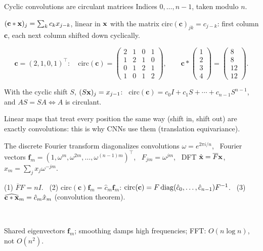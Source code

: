 \documentclass[aspectratio=1610,11pt]{beamer}
\begin{document}
\begin{frame}{Cyclic convolutions are circulant matrices}
    \small
    Indices $0, \ldots, n - 1$, taken modulo $n$.
    \begin{definition}
        \small $(\mathbf{c} \ast \mathbf{x})_j = \sum_kc_kx_{j-k}$, linear in $\mathbf{x}$ with the matrix $\mathrm{circ}(\mathbf{c})_{jk} = c_{j-k}$: first column $\mathbf{c}$, each next column shifted down cyclically.
    \end{definition}
    \[\mathbf{c} = (2, 1, 0, 1)^\top: \quad \mathrm{circ}(\mathbf{c}) = \begin{pmatrix} 2 & 1 & 0 & 1 \\ 1 & 2 & 1 & 0 \\ 0 & 1 & 2 & 1 \\ 1 & 0 & 1 & 2 \end{pmatrix}, \qquad \mathbf{c} \ast \begin{pmatrix} 1 \\ 2 \\ 3 \\ 4 \end{pmatrix} = \begin{pmatrix} 8 \\ 8 \\ 12 \\ 12 \end{pmatrix}.\]
    \begin{proposition}
        \small With the cyclic shift $S$, $(S\mathbf{x})_j = x_{j-1}$: \ $\mathrm{circ}(\mathbf{c}) = c_0I + c_1S + \cdots + c_{n-1}S^{n-1}$, and $AS = SA \iff A$ is circulant.
    \end{proposition}
    \textcolor{mlcolor}{Linear maps that treat every position the same way (shift in, shift out) are exactly convolutions: this is why CNNs use them (translation equivariance).}
\end{frame}

\begin{frame}{The discrete Fourier transform diagonalizes convolutions}
    \small
    $\omega = e^{2\pi i/n}$, \ Fourier vectors $\mathbf{f}_m = (1, \omega^m, \omega^{2m}, \ldots, \omega^{(n-1)m})^\top$, \ $F_{jm} = \omega^{jm}$, \ DFT $\hat{\mathbf{x}} = \overline{F}\mathbf{x}$, $\hat x_m = \sum_jx_j\omega^{-jm}$.
    \begin{theorem}
        \small (1) $\overline{F}F = nI$. \ (2) $\mathrm{circ}(\mathbf{c})\mathbf{f}_m = \hat c_m\mathbf{f}_m$: $\mathrm{circ}(\mathbf{c}) = F\operatorname{diag}(\hat c_0, \ldots, \hat c_{n-1})F^{-1}$. \ (3) $\widehat{\mathbf{c} \ast \mathbf{x}}_m = \hat c_m\hat x_m$ (convolution theorem).
    \end{theorem}
    \centering{}
    \\[0.1em]
    \raggedright Shared eigenvectors $\mathbf{f}_m$; smoothing damps high frequencies; FFT: $O(n\log n)$, not $O(n^2)$.
\end{frame}
\end{document}
